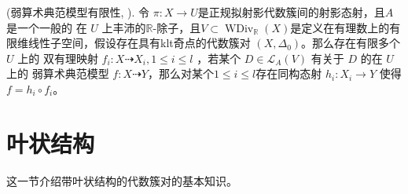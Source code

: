 \begin{theorem}\label{finitewlcm}
  (弱算术典范模型有限性, \citet[Theorem E]{BCHM10}).
	令 $\pi: X\to U$是正规拟射影代数簇间的射影态射，且$A$是一个一般的 在 $U$ 上丰沛的$\mathbb{R}$-除子，且$V \subset \operatorname{WDiv}_{\mathbb{R}}(X)$是定义在有理数上的有限维线性子空间，假设存在具有klt奇点的代数簇对 $(X,\Delta_{0})$。那么存在有限多个 $U$ 上的 双有理映射 $f_{i}:X \dashrightarrow X_{i},1\leqslant i\leqslant l$ ，若某个 $D \in \mathcal{L}_{A}(V)$ 有关于 $D$ 的在 $U$ 上的  弱算术典范模型 $f:X \dashrightarrow  Y$，那么对某个$1\leqslant i\leqslant l$存在同构态射  $h_{i}:X_{i} \to Y$ 使得 $f=h_{i}\circ f_{i}$。
\end{theorem}

\section{叶状结构}

这一节介绍带叶状结构的代数簇对的基本知识。
